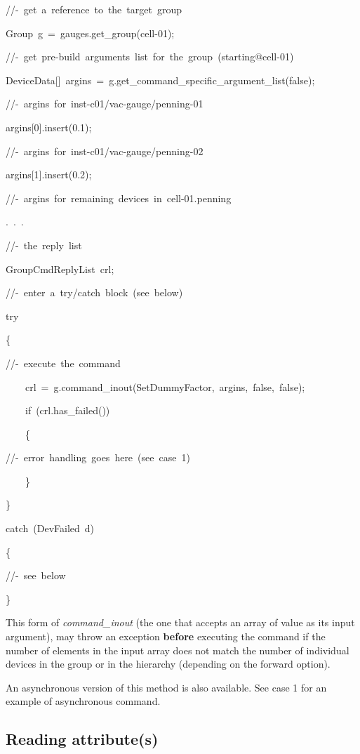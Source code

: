
\begin{lyxcode}
//-~get~a~reference~to~the~target~group

Group~g~=~gauges.get\_group(\textquotedbl{}cell-01\textquotedbl{});

//-~get~pre-build~arguments~list~for~the~group~(starting@cell-01)

DeviceData{[}{]}~argins~=~g.get\_command\_specific\_argument\_list(false);

//-~argins~for~inst-c01/vac-gauge/penning-01

argins{[}0{]}.insert(0.1);

//-~argins~for~inst-c01/vac-gauge/penning-02

argins{[}1{]}.insert(0.2);

//-~argins~for~remaining~devices~in~cell-01.penning

.~.~.

//-~the~reply~list~

GroupCmdReplyList~crl;

//-~enter~a~try/catch~block~(see~below)

try

\{

//-~execute~the~command

~~~~crl~=~g.command\_inout(\textquotedbl{}SetDummyFactor\textquotedbl{},~argins,~false,~false);

~~~~if~(crl.has\_failed())

~~~~\{

//-~error~handling~goes~here~(see~case~1)

~~~~\}

\}

catch~(DevFailed~d)

\{

//-~see~below

\}
\end{lyxcode}


This form of \emph{command\_inout} (the one
that accepts an array of value as its input argument), may throw an
exception \textbf{before} executing the command
if the number of elements in the input array does not match the number
of individual devices in the group or in the hierarchy
(depending on the forward option). 

An asynchronous version of this method is also available. See case
1 for an example of asynchronous command.

\subsection{Reading attribute(s)\label{subsec:Read-attr} }

